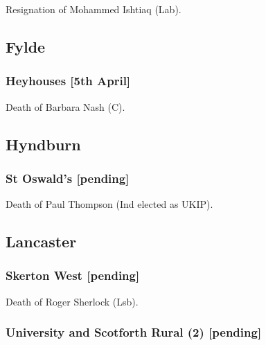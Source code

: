 \documentclass[a4paper,openany]{book}
\begin{document}
\begin{resultsiii}

Resignation of Mohammed Ishtiaq (Lab).

\subsection*{Fylde}

\subsubsection*{Heyhouses \hspace*{\fill}\nolinebreak[1]%
\enspace\hspace*{\fill}
[5th April]}


Death of Barbara Nash (C).

\subsection*{Hyndburn}

\subsubsection*{St Oswald's \hspace*{\fill}\nolinebreak[1]%
\enspace\hspace*{\fill}
[pending]}


Death of Paul Thompson (Ind elected as UKIP).

\subsection*{Lancaster}

\subsubsection*{Skerton West \hspace*{\fill}\nolinebreak[1]%
\enspace\hspace*{\fill}
[pending]}


Death of Roger Sherlock (Lsb).

\subsubsection*{University and Scotforth Rural (2) \hspace*{\fill}\nolinebreak[1]%
\enspace\hspace*{\fill}
[pending]}


\end{resultsiii}
\end{document}
